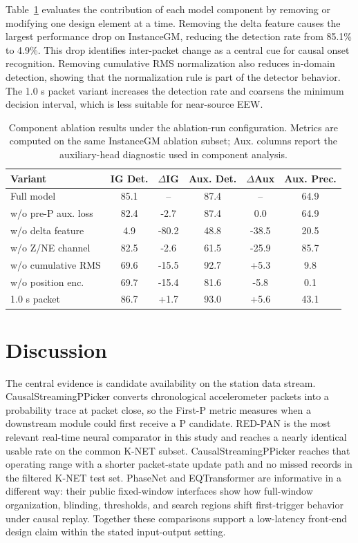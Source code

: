 \documentclass[journal]{IEEEtran}
\newcommand{\modelv}{CausalStreamingPPicker\xspace}
\newcommand{\tgrsdensetablesetup}{\footnotesize\setlength{\tabcolsep}{2.0pt}\renewcommand{\arraystretch}{1.06}}
\begin{document}
Table~\ref{tab:ablation} evaluates the contribution of each model component by removing or modifying one design element at a time. Removing the delta feature causes the largest performance drop on InstanceGM, reducing the detection rate from 85.1\% to 4.9\%. This drop identifies inter-packet change as a central cue for causal onset recognition. Removing cumulative RMS normalization also reduces in-domain detection, showing that the normalization rule is part of the detector behavior. The 1.0 s packet variant increases the detection rate and coarsens the minimum decision interval, which is less suitable for near-source EEW.

\begin{table}[H]
\centering
\caption{Component ablation results under the ablation-run configuration. Metrics are computed on the same InstanceGM ablation subset; Aux. columns report the auxiliary-head diagnostic used in component analysis.}
\label{tab:ablation}
{\tgrsdensetablesetup
\begin{tabular}{@{}lccccc@{}}
\toprule
Variant & IG Det. & $\Delta$IG & Aux. Det. & $\Delta$Aux & Aux. Prec.\\
\midrule
Full model & 85.1 & -- & 87.4 & -- & 64.9\\
w/o pre-P aux. loss & 82.4 & -2.7 & 87.4 & 0.0 & 64.9\\
w/o delta feature & 4.9 & -80.2 & 48.8 & -38.5 & 20.5\\
w/o Z/NE channel & 82.5 & -2.6 & 61.5 & -25.9 & 85.7\\
w/o cumulative RMS & 69.6 & -15.5 & 92.7 & +5.3 & 9.8\\
w/o position enc. & 69.7 & -15.4 & 81.6 & -5.8 & 0.1\\
1.0 s packet & 86.7 & +1.7 & 93.0 & +5.6 & 43.1\\
\bottomrule
\end{tabular}}
\end{table}

\section{Discussion}
The central evidence is candidate availability on the station data stream. \modelv{} converts chronological accelerometer packets into a probability trace at packet close, so the First-P metric measures when a downstream module could first receive a P candidate. RED-PAN is the most relevant real-time neural comparator in this study and reaches a nearly identical usable rate on the common K-NET subset. \modelv{} reaches that operating range with a shorter packet-state update path and no missed records in the filtered K-NET test set. PhaseNet and EQTransformer are informative in a different way: their public fixed-window interfaces show how full-window organization, blinding, thresholds, and search regions shift first-trigger behavior under causal replay. Together these comparisons support a low-latency front-end design claim within the stated input-output setting.
\end{document}
